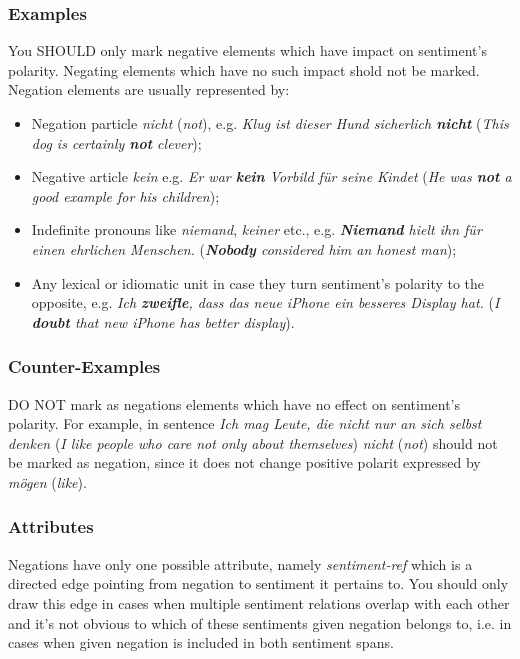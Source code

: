 \documentclass[11pt,a4paper]{article}
\begin{document}
\subsubsection{Examples}
You SHOULD only mark negative elements which have impact on
sentiment's polarity. Negating elements which have no such impact
shold not be marked. Negation elements are usually represented by:
\begin{itemize}
  \item Negation particle \textit{nicht} (\textit{not}),
    e.g. \textit{Klug ist dieser Hund sicherlich \textbf{nicht}}
    (\textit{This dog is certainly \textbf{not} clever});

  \item Negative article \textit{kein} e.g. \textit{Er war
    \textbf{kein} Vorbild f\"ur seine Kindet} (\textit{He was
    \textbf{not} a good example for his children});

  \item Indefinite pronouns like \textit{niemand}, \textit{keiner}
    etc., e.g. \textit{\textbf{Niemand} hielt ihn f\"ur einen
      ehrlichen Menschen.} (\textit{\textbf{Nobody} considered him an
      honest man});

  \item Any lexical or idiomatic unit in case they turn sentiment's
    polarity to the opposite, e.g. \textit{Ich \textbf{zweifle}, dass
      das neue iPhone ein besseres Display hat.} (\textit{I
      \textbf{doubt} that new iPhone has better display}).
\end{itemize}

\subsubsection{Counter-Examples}
DO NOT mark as negations elements which have no effect on sentiment's
polarity. For example, in sentence \textit{Ich mag Leute, die nicht
  nur an sich selbst denken} (\textit{I like people who care not only
  about themselves}) \textit{nicht} (\textit{not}) should not be
marked as negation, since it does not change positive polarit
expressed by \textit{m\"ogen} (\textit{like}).

\subsubsection{Attributes}
Negations have only one possible attribute, namely
\textit{sentiment-ref} which is a directed edge pointing from negation
to sentiment it pertains to. You should only draw this edge in cases
when multiple sentiment relations overlap with each other and it's not
obvious to which of these sentiments given negation belongs to,
i.e. in cases when given negation is included in both sentiment spans.
\end{document}
